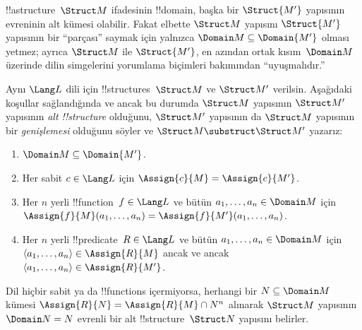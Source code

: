 


!!a{structure}~$\Struct M$ ifadesinin !!{domain}, başka bir
$\Struct{M'}$ yapısının evreninin alt kümesi olabilir. Fakat elbette
$\Struct M$ yapısını $\Struct{M'}$ yapısının bir ``parçası'' saymak
için yalnızca $\Domain M\subseteq\Domain{M'}$ olması yetmez; ayrıca
$\Struct M$ ile $\Struct{M'}$, en azından ortak kısım~$\Domain M$
üzerinde dilin simgelerini yorumlama biçimleri bakımından
``uyuşmalıdır.''

\begin{defn}
Aynı $\Lang L$ dili için !!{structure}s~$\Struct M$ ve $\Struct M'$
verilsin. Aşağıdaki koşullar sağlandığında ve ancak bu durumda
$\Struct M$ yapısının $\Struct M'$ yapısının \emph{alt !!{structure}}
olduğunu, $\Struct M'$ yapısının da $\Struct M$ yapısının bir
\emph{genişlemesi} olduğunu söyler ve $\Struct M\substruct\Struct M'$
yazarız:
\begin{enumerate}
\item $\Domain M\subseteq\Domain{M'}$.
\item Her sabit $c\in\Lang L$ için
  $\Assign{c}{M}=\Assign{c}{M'}$.
\item Her $n$ yerli !!{function}~$f\in\Lang L$ ve bütün
  $a_1,\dots,a_n\in\Domain M$ için
  $\Assign{f}{M}(a_1,\dots,a_n)=\Assign{f}{M'}(a_1,\dots,a_n)$.
\item Her $n$ yerli !!{predicate}~$R\in\Lang L$ ve bütün
  $a_1,\dots,a_n\in\Domain M$ için
  $\langle a_1,\dots,a_n\rangle\in\Assign{R}{M}$ ancak ve ancak
  $\langle a_1,\dots,a_n\rangle\in\Assign{R}{M'}$.
\end{enumerate}
\end{defn}

\begin{rem}
Dil hiçbir sabit ya da !!{function}s içermiyorsa, herhangi bir
$N\subseteq\Domain M$ kümesi $\Assign{R}{N}=\Assign{R}{M}\cap N^n$
alınarak $\Struct M$ yapısının $\Domain N=N$ evrenli bir alt
!!{structure}~$\Struct N$ yapısını belirler.
\end{rem}



